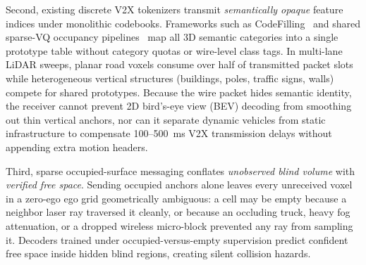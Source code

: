 \documentclass[journal]{IEEEtran}
\begin{document}
Second, existing discrete V2X tokenizers transmit \textit{semantically opaque} feature indices under monolithic codebooks. Frameworks such as CodeFilling~\cite{hu2024codefilling} and shared sparse-VQ occupancy pipelines~\cite{li2026vqsop} map all 3D semantic categories into a single prototype table without category quotas or wire-level class tags. In multi-lane LiDAR sweeps, planar road voxels consume over half of transmitted packet slots while heterogeneous vertical structures (buildings, poles, traffic signs, walls) compete for shared prototypes. Because the wire packet hides semantic identity, the receiver cannot prevent 2D bird's-eye view (BEV) decoding from smoothing out thin vertical anchors, nor can it separate dynamic vehicles from static infrastructure to compensate 100--500~ms V2X transmission delays without appending extra motion headers.

Third, sparse occupied-surface messaging conflates \textit{unobserved blind volume} with \textit{verified free space}. Sending occupied anchors alone leaves every unreceived voxel in a zero-ego ego grid geometrically ambiguous: a cell may be empty because a neighbor laser ray traversed it cleanly, or because an occluding truck, heavy fog attenuation, or a dropped wireless micro-block prevented any ray from sampling it. Decoders trained under occupied-versus-empty supervision predict confident free space inside hidden blind regions, creating silent collision hazards.
\end{document}
